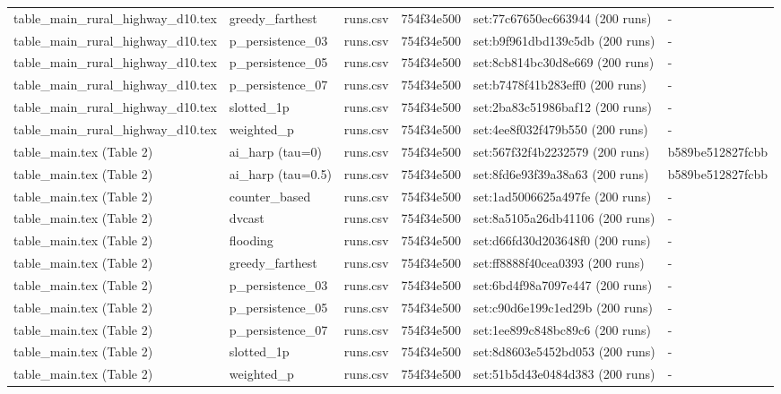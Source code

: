 \begin{tabular}{llllll}
table\_main\_rural\_highway\_d10.tex & greedy\_farthest & runs.csv & 754f34e500 & set:77c67650ec663944 (200 runs) & - \\
table\_main\_rural\_highway\_d10.tex & p\_persistence\_03 & runs.csv & 754f34e500 & set:b9f961dbd139c5db (200 runs) & - \\
table\_main\_rural\_highway\_d10.tex & p\_persistence\_05 & runs.csv & 754f34e500 & set:8cb814bc30d8e669 (200 runs) & - \\
table\_main\_rural\_highway\_d10.tex & p\_persistence\_07 & runs.csv & 754f34e500 & set:b7478f41b283eff0 (200 runs) & - \\
table\_main\_rural\_highway\_d10.tex & slotted\_1p & runs.csv & 754f34e500 & set:2ba83c51986baf12 (200 runs) & - \\
table\_main\_rural\_highway\_d10.tex & weighted\_p & runs.csv & 754f34e500 & set:4ee8f032f479b550 (200 runs) & - \\
table\_main.tex (Table 2) & ai\_harp (tau=0) & runs.csv & 754f34e500 & set:567f32f4b2232579 (200 runs) & b589be512827fcbb \\
table\_main.tex (Table 2) & ai\_harp (tau=0.5) & runs.csv & 754f34e500 & set:8fd6e93f39a38a63 (200 runs) & b589be512827fcbb \\
table\_main.tex (Table 2) & counter\_based & runs.csv & 754f34e500 & set:1ad5006625a497fe (200 runs) & - \\
table\_main.tex (Table 2) & dvcast & runs.csv & 754f34e500 & set:8a5105a26db41106 (200 runs) & - \\
table\_main.tex (Table 2) & flooding & runs.csv & 754f34e500 & set:d66fd30d203648f0 (200 runs) & - \\
table\_main.tex (Table 2) & greedy\_farthest & runs.csv & 754f34e500 & set:ff8888f40cea0393 (200 runs) & - \\
table\_main.tex (Table 2) & p\_persistence\_03 & runs.csv & 754f34e500 & set:6bd4f98a7097e447 (200 runs) & - \\
table\_main.tex (Table 2) & p\_persistence\_05 & runs.csv & 754f34e500 & set:c90d6e199c1ed29b (200 runs) & - \\
table\_main.tex (Table 2) & p\_persistence\_07 & runs.csv & 754f34e500 & set:1ee899c848bc89c6 (200 runs) & - \\
table\_main.tex (Table 2) & slotted\_1p & runs.csv & 754f34e500 & set:8d8603e5452bd053 (200 runs) & - \\
table\_main.tex (Table 2) & weighted\_p & runs.csv & 754f34e500 & set:51b5d43e0484d383 (200 runs) & - \\

\end{tabular}
